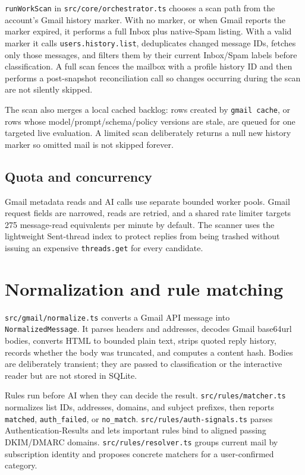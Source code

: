 \documentclass[12pt,oneside]{book}
\newcommand{\code}[1]{\nolinkurl{#1}}
\newcommand{\file}[1]{\nolinkurl{#1}}
\newcommand{\term}[1]{\texttt{#1}}
\begin{document}
\code{runWorkScan} in \file{src/core/orchestrator.ts} chooses a scan path from the account's Gmail history marker. With no marker, or when Gmail reports the marker expired, it performs a full Inbox plus native-Spam listing. With a valid marker it calls \code{users.history.list}, deduplicates changed message IDs, fetches only those messages, and filters them by their current Inbox/Spam labels before classification. A full scan fences the mailbox with a profile history ID and then performs a post-snapshot reconciliation call so changes occurring during the scan are not silently skipped.

The scan also merges a local cached backlog: rows created by \term{gmail cache}, or rows whose model/prompt/schema/policy versions are stale, are queued for one targeted live evaluation. A limited scan deliberately returns a null new history marker so omitted mail is not skipped forever.

\subsection{Quota and concurrency}

Gmail metadata reads and AI calls use separate bounded worker pools. Gmail request fields are narrowed, reads are retried, and a shared rate limiter targets 275 message-read equivalents per minute by default. The scanner uses the lightweight Sent-thread index to protect replies from being trashed without issuing an expensive \code{threads.get} for every candidate.

\section{Normalization and rule matching}

\file{src/gmail/normalize.ts} converts a Gmail API message into \code{NormalizedMessage}. It parses headers and addresses, decodes Gmail base64url bodies, converts HTML to bounded plain text, strips quoted reply history, records whether the body was truncated, and computes a content hash. Bodies are deliberately transient; they are passed to classification or the interactive reader but are not stored in SQLite.

Rules run before AI when they can decide the result. \file{src/rules/matcher.ts} normalizes list IDs, addresses, domains, and subject prefixes, then reports \code{matched}, \code{auth_failed}, or \code{no_match}. \file{src/rules/auth-signals.ts} parses Authentication-Results and lets important rules bind to aligned passing DKIM/DMARC domains. \file{src/rules/resolver.ts} groups current mail by subscription identity and proposes concrete matchers for a user-confirmed category.
\end{document}
